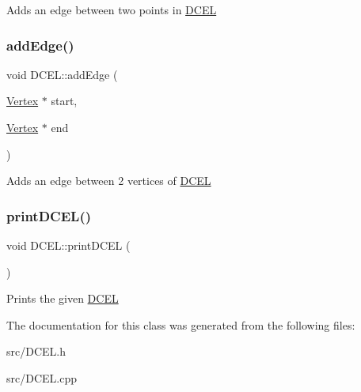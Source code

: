 Adds an edge between two points in \hyperlink{classDCEL}{D\+C\+EL} \mbox{\label{classDCEL_aa4908d9d80085b2f13aee78bcc9e87c7}} 
\subsubsection{\texorpdfstring{add\+Edge()}{addEdge()}\hspace{0.1cm}{\footnotesize\ttfamily [2/2]}}
{\footnotesize\ttfamily void D\+C\+E\+L\+::add\+Edge (\begin{DoxyParamCaption}\item[{\hyperlink{classVertex}{Vertex} $\ast$}]{start,  }\item[{\hyperlink{classVertex}{Vertex} $\ast$}]{end }\end{DoxyParamCaption})}

Adds an edge between 2 vertices of \hyperlink{classDCEL}{D\+C\+EL} \mbox{\label{classDCEL_aaa419662b88fbdbe7e7a2276abf334a1}} 
\subsubsection{\texorpdfstring{print\+D\+C\+E\+L()}{printDCEL()}}
{\footnotesize\ttfamily void D\+C\+E\+L\+::print\+D\+C\+EL (\begin{DoxyParamCaption}{ }\end{DoxyParamCaption})}

Prints the given \hyperlink{classDCEL}{D\+C\+EL} 

The documentation for this class was generated from the following files\+:\begin{DoxyCompactItemize}
\item 
src/D\+C\+E\+L.\+h\item 
src/D\+C\+E\+L.\+cpp\end{DoxyCompactItemize}
